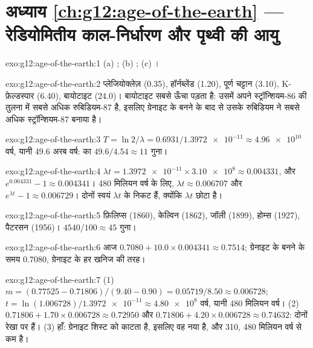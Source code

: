 \section*{अध्याय \ref{ch:g12:age-of-the-earth} --- रेडियोमितीय काल-निर्धारण और पृथ्वी की आयु}

\begin{solution}{exo:g12:age-of-the-earth:1}
(a) ; (b) ; (c) ।
\end{solution}

\begin{solution}{exo:g12:age-of-the-earth:2}
प्लेजियोक्लेज़ (0.35), हॉर्नब्लेंड (1.20), पूर्ण चट्टान (3.10), K-फ़ेल्डस्पार (6.40),
बायोटाइट (24.0)। बायोटाइट सबसे ऊँचा पड़ता है: उसमें अपने स्ट्रॉन्शियम-86 की तुलना में सबसे अधिक
रुबिडियम-87 है, इसलिए ग्रेनाइट के बनने के बाद से उसके रुबिडियम ने सबसे अधिक
स्ट्रॉन्शियम-87 बनाया है।
\end{solution}

\begin{solution}{exo:g12:age-of-the-earth:3}
$T = \ln 2/\lambda = 0.6931/\num{1.3972e-11} \approx \num{4.96e10}$ वर्ष,
यानी 49.6 अरब वर्ष:  का $49.6/4.54 \approx 11$ गुना।
\end{solution}

\begin{solution}{exo:g12:age-of-the-earth:4}
$\lambda t = \num{1.3972e-11} \times \num{3.10e8} \approx 0.004331$, और
$e^{0.004331} - 1 \approx 0.004341$। 480 मिलियन वर्ष के लिए, $\lambda t
\approx 0.006707$ और $e^{\lambda t} - 1 \approx 0.006729$। दोनों स्वयं
$\lambda t$ के निकट हैं, क्योंकि $\lambda t$ छोटा है।
\end{solution}

\begin{solution}{exo:g12:age-of-the-earth:5}
फ़िलिप्स (1860), केल्विन (1862), जॉली (1899), होम्स (1927), पैटरसन
(1956)। $4540/100 \approx 45$ गुना।
\end{solution}

\begin{solution}{exo:g12:age-of-the-earth:6}
आज $0.7080 + 10.0 \times 0.004341 \approx 0.7514$; ग्रेनाइट के बनने के समय 0.7080,
ग्रेनाइट के हर खनिज की तरह।
\end{solution}

\begin{solution}{exo:g12:age-of-the-earth:7}
(1) $m = (0.77525 - 0.71806)/(9.40 - 0.90) = 0.05719/8.50 \approx 0.006728$;
$t = \ln(1.006728)/\num{1.3972e-11} \approx \num{4.80e8}$ वर्ष, यानी 480 मिलियन
वर्ष। (2) $0.71806 + 1.70 \times 0.006728 \approx 0.72950$ और $0.71806 + 4.20
\times 0.006728 \approx 0.74632$: दोनों रेखा पर हैं। (3) हाँ: ग्रेनाइट
शिस्ट को काटता है, इसलिए वह नया है, और 310, 480 मिलियन वर्ष से कम है।
\end{solution}


